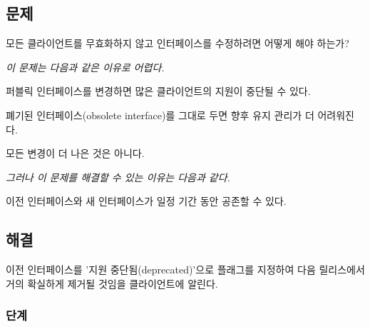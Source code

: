 \documentclass[a4paper,10pt,twoside]{book}
\begin{document}

\subsection*{문제}

모든 클라이언트를 무효화하지 않고 인터페이스를 수정하려면 어떻게 해야 하는가?

\emph{이 문제는 다음과 같은 이유로 어렵다.}

\begin{bulletlist}
\item 퍼블릭 인터페이스를 변경하면 많은 클라이언트의 지원이 중단될 수 있다.

\item 폐기된 인터페이스(obsolete interface)를 그대로 두면 향후 유지 관리가 더 어려워진다.

\item 모든 변경이 더 나은 것은 아니다.
\end{bulletlist}

\emph{그러나 이 문제를 해결할 수 있는 이유는 다음과 같다.}

\begin{bulletlist}
\item 이전 인터페이스와 새 인터페이스가 일정 기간 동안 공존할 수 있다.
\end{bulletlist}

\subsection*{해결}

이전 인터페이스를 '지원 중단됨(deprecated)'으로 플래그를 지정하여 다음 릴리스에서 거의 확실하게 제거될 것임을 클라이언트에 알린다.

\subsubsection*{단계}
\end{document}
